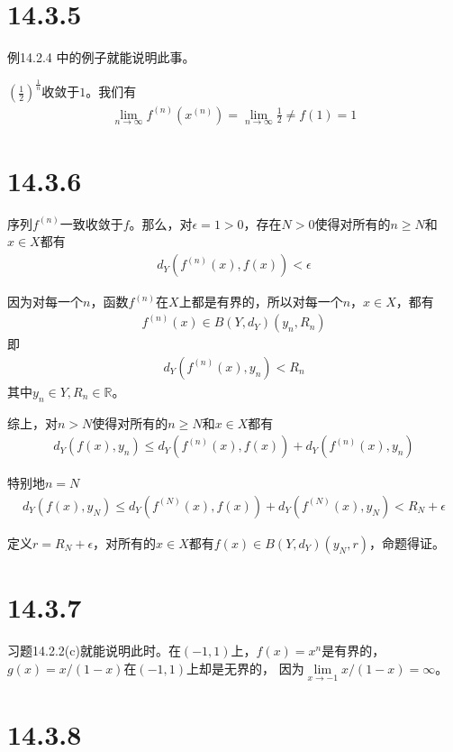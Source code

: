 \documentclass{article}
\begin{document}
\section*{14.3.5}

例14.2.4 中的例子就能说明此事。

$(\frac{1}{2})^{\frac{1}{n}}$收敛于$1$。我们有
\begin{align*}
  \lim\limits_{n \to \infty} f^{(n)}(x^{(n)}) = \lim\limits_{n \to \infty} \frac{1}{2} \neq f(1) = 1
\end{align*}

\section*{14.3.6}

序列$f^{(n)}$一致收敛于$f$。那么，对$\epsilon = 1 > 0$，存在$N > 0$使得对所有的$n \geq N$和$x \in X$都有
\begin{align*}
  d_Y(f^{(n)}(x), f(x)) < \epsilon
\end{align*}

因为对每一个$n$，函数$f^{(n)}$在$X$上都是有界的，所以对每一个$n$，$x \in X$，都有
\begin{align*}
  f^{(n)}(x) \in B(Y,d_Y) (y_n, R_n)
\end{align*}
即
\begin{align*}
  d_Y(f^{(n)}(x), y_n) < R_n
\end{align*}
其中$y_n \in Y, R_n \in \mathbb{R}$。

综上，对$n > N$使得对所有的$n \geq N$和$x \in X$都有
\begin{align*}
  d_Y(f(x), y_n) \leq d_Y(f^{(n)}(x), f(x)) + d_Y(f^{(n)}(x), y_n) 
\end{align*}

特别地$n = N$
\begin{align*}
  d_Y(f(x), y_N) \leq d_Y(f^{(N)}(x), f(x)) + d_Y(f^{(N)}(x), y_N) < R_N + \epsilon
\end{align*}

定义$r = R_N + \epsilon$，对所有的$x \in X$都有$f(x) \in B(Y, d_Y) (y_N, r)$，命题得证。

\section*{14.3.7}

习题14.2.2(c)就能说明此时。在$(-1, 1)$上，$f(x) = x^n$是有界的，$g(x) = x/(1-x)$在$(-1, 1)$上却是无界的，
因为$\lim\limits_{x \to -1} x/(1-x) = \infty$。

\section*{14.3.8}
\end{document}
